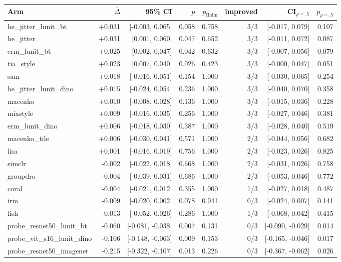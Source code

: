 \begin{tabular}{lrrrrrrr}
\toprule
Arm & $\bar\Delta$ & 95\% CI & $p$ & $p_\text{Holm}$ & improved & CI$_{\rho=.5}$ & $p_{\rho=.5}$ \\
\midrule
he\_jitter\_lunit\_bt & +0.031 & [-0.003, 0.065] & 0.058 & 0.758 & 3/3 & [-0.017, 0.079] & 0.107 \\
he\_jitter & +0.031 & [0.001, 0.060] & 0.047 & 0.652 & 3/3 & [-0.011, 0.072] & 0.087 \\
erm\_lunit\_bt & +0.025 & [0.002, 0.047] & 0.042 & 0.632 & 3/3 & [-0.007, 0.056] & 0.079 \\
tia\_style & +0.023 & [0.007, 0.040] & 0.026 & 0.423 & 3/3 & [-0.000, 0.047] & 0.051 \\
sam & +0.018 & [-0.016, 0.051] & 0.154 & 1.000 & 3/3 & [-0.030, 0.065] & 0.254 \\
he\_jitter\_lunit\_dino & +0.015 & [-0.024, 0.054] & 0.236 & 1.000 & 3/3 & [-0.040, 0.070] & 0.358 \\
macenko & +0.010 & [-0.008, 0.028] & 0.136 & 1.000 & 3/3 & [-0.015, 0.036] & 0.228 \\
mixstyle & +0.009 & [-0.016, 0.035] & 0.256 & 1.000 & 3/3 & [-0.027, 0.046] & 0.381 \\
erm\_lunit\_dino & +0.006 & [-0.018, 0.030] & 0.387 & 1.000 & 3/3 & [-0.028, 0.040] & 0.519 \\
macenko\_tile & +0.006 & [-0.030, 0.041] & 0.571 & 1.000 & 2/3 & [-0.044, 0.056] & 0.682 \\
lisa & +0.001 & [-0.016, 0.019] & 0.756 & 1.000 & 2/3 & [-0.023, 0.026] & 0.825 \\
simclr & -0.002 & [-0.022, 0.018] & 0.668 & 1.000 & 2/3 & [-0.031, 0.026] & 0.758 \\
groupdro & -0.004 & [-0.039, 0.031] & 0.686 & 1.000 & 2/3 & [-0.053, 0.046] & 0.772 \\
coral & -0.004 & [-0.021, 0.012] & 0.355 & 1.000 & 1/3 & [-0.027, 0.018] & 0.487 \\
irm & -0.009 & [-0.020, 0.002] & 0.078 & 0.941 & 0/3 & [-0.024, 0.007] & 0.141 \\
fish & -0.013 & [-0.052, 0.026] & 0.286 & 1.000 & 1/3 & [-0.068, 0.042] & 0.415 \\
probe\_resnet50\_lunit\_bt & -0.060 & [-0.081, -0.038] & 0.007 & 0.131 & 0/3 & [-0.090, -0.029] & 0.014 \\
probe\_vit\_s16\_lunit\_dino & -0.106 & [-0.148, -0.063] & 0.009 & 0.153 & 0/3 & [-0.165, -0.046] & 0.017 \\
probe\_resnet50\_imagenet & -0.215 & [-0.322, -0.107] & 0.013 & 0.226 & 0/3 & [-0.367, -0.062] & 0.026 \\
\bottomrule
\end{tabular}
